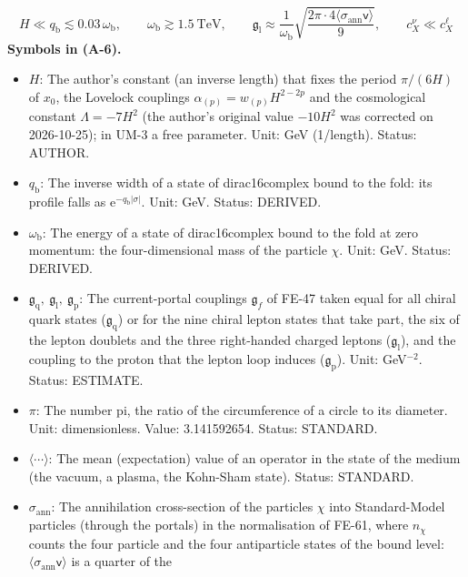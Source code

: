 \documentclass[
  10pt,
]{article}
\providecommand{\tightlist}{%
  \setlength{\itemsep}{0pt}\setlength{\parskip}{0pt}}
\begin{document}
\[
H \ll q_{\mathrm{b}} \lesssim 0.03\,\omega_{\mathrm{b}},\qquad \omega_{\mathrm{b}} \gtrsim 1.5\ \text{TeV},\qquad
\mathfrak{g}_{\mathrm{l}} \approx \frac{1}{\omega_{\mathrm{b}}}\sqrt{\frac{2\pi\cdot4\langle\sigma_{\mathrm{ann}}\mathsf{v}\rangle}{9}},\qquad c^{\nu}_X \ll c^{\ell}_X \tag{A-6}
\] \textbf{Symbols in (A-6).}

\begin{itemize}
\tightlist
\item
  \(H\): The author's constant (an inverse length) that fixes the period
  \(\pi/(6H)\) of \(x_0\), the Lovelock couplings
  \(\alpha_{(p)} = w_{(p)}H^{2-2p}\) and the cosmological constant
  \(\Lambda = -7H^2\) (the author's original value \(-10H^2\) was
  corrected on 2026-10-25); in UM-3 a free parameter. Unit: GeV
  (1/length). Status: AUTHOR.
\item
  \(q_{\mathrm{b}}\): The inverse width of a state of dirac16complex
  bound to the fold: its profile falls as
  \(\mathrm{e}^{-q_{\mathrm{b}}\lvert\sigma\rvert}\). Unit: GeV. Status:
  DERIVED.
\item
  \(\omega_{\mathrm{b}}\): The energy of a state of dirac16complex bound
  to the fold at zero momentum: the four-dimensional mass of the
  particle \(\chi\). Unit: GeV. Status: DERIVED.
\item
  \(\mathfrak{g}_{\mathrm{q}},\ \mathfrak{g}_{\mathrm{l}},\ \mathfrak{g}_{\mathrm{p}}\):
  The current-portal couplings \(\mathfrak{g}_f\) of FE-47 taken equal
  for all chiral quark states (\(\mathfrak{g}_{\mathrm{q}}\)) or for the
  nine chiral lepton states that take part, the six of the lepton
  doublets and the three right-handed charged leptons
  (\(\mathfrak{g}_{\mathrm{l}}\)), and the coupling to the proton that
  the lepton loop induces (\(\mathfrak{g}_{\mathrm{p}}\)). Unit:
  GeV\(^{-2}\). Status: ESTIMATE.
\item
  \(\pi\): The number pi, the ratio of the circumference of a circle to
  its diameter. Unit: dimensionless. Value: 3.141592654. Status:
  STANDARD.
\item
  \(\langle\cdots\rangle\): The mean (expectation) value of an operator
  in the state of the medium (the vacuum, a plasma, the Kohn-Sham
  state). Status: STANDARD.
\item
  \(\sigma_{\mathrm{ann}}\): The annihilation cross-section of the
  particles \(\chi\) into Standard-Model particles (through the portals)
  in the normalisation of FE-61, where \(n_\chi\) counts the four
  particle and the four antiparticle states of the bound level:
  \(\langle\sigma_{\mathrm{ann}}\mathsf{v}\rangle\) is a quarter of the

\end{itemize}
\end{document}
